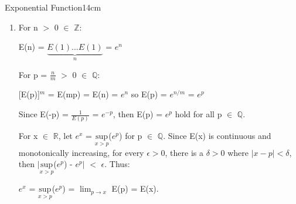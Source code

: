 \begin{definition}{Exponential Function}{14cm}
\begin{enumerate}[label=(\alph*), leftmargin=1.5cm, itemsep=0.1cm]
                \hspace{0.9cm}
                = E(x) $\lim_{h \rightarrow 0}$ $\frac{E(h) - 1}{h}$
                = E(x) ($\lim_{h \rightarrow 0}$ $\frac{E(h)}{h}$
                        - $\lim_{h \rightarrow 0}$ $\frac{1}{h}$)

                \hspace{0.9cm}
                = E(x) ($\lim_{h \rightarrow 0} \frac{1}{h} + 1$
                        - $\lim_{h \rightarrow 0} \frac{1}{h}$)
                = E(x)

            \item For n $>$ 0 $\in$ $\mathbb{Z}$:
            
                \hspace{0.5cm}
                E(n) = $\underbrace{E(1)...E(1)}_n$ = $e^n$

                For p = $\frac{n}{m}$ $>$ 0 $\in$ $\mathbb{Q}$:

                \hspace{0.5cm}
                [E(p)]$^{m}$ = E(mp) = E(n) = $e^n$
                so E(p) = $e^{n/m}$ = $e^p$
                
                Since E(-p) = $\frac{1}{E(p)}$ = $e^{-p}$, then
                E(p) = $e^p$ hold for all p $\in$ $\mathbb{Q}$.

                For x $\in$ $\mathbb{R}$, let $e^x$ =
                $\underset{x > p}{\text{sup}}$($e^p$) for p $\in$ $\mathbb{Q}$.
                Since E(x) is continuous and monotonically increasing,
                for every $\epsilon > 0$, there is a $\delta > 0$ where
                $|x - p| < \delta$, then
                $|$$\underset{x > p}{\text{sup}}$($e^p$) - $e^p$$|$
                $<$ $\epsilon$. Thus:

                \hspace{0.5cm}
                $e^x$ = $\underset{x > p}{\text{sup}}$($e^p$)
                = $\lim_{p \rightarrow x}$ E(p) = E(x).
        \end{enumerate}
    \end{definition}

    \vspace{0.5cm}



